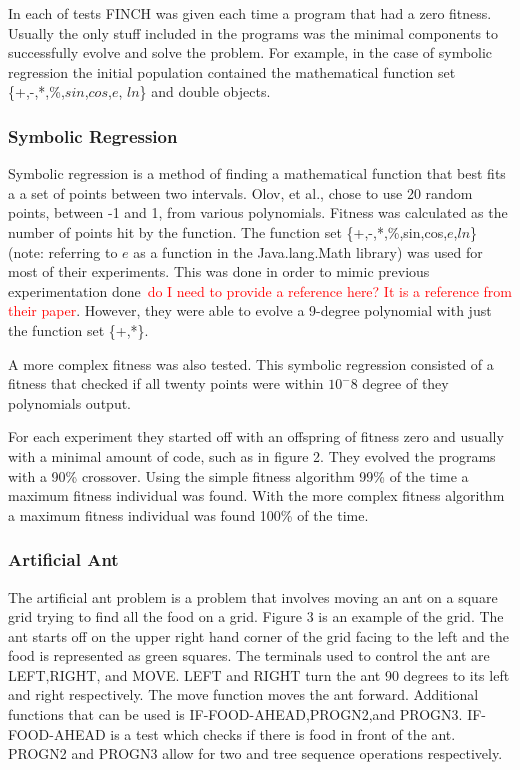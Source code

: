 \documentclass{sig-alternate}
\newcommand{\mycomment}[1]{\textcolor{red}{#1}}
\begin{document}
In each of tests FINCH was given each time a program that had a zero fitness. Usually the only stuff included in the programs was the minimal components to successfully evolve and solve the problem. For example, in the case of symbolic regression the initial population contained the mathematical function set \{+,-,*,\%,$sin$,$cos$,$e$, $ln$\} and double objects. 


\subsubsection{Symbolic Regression}
Symbolic regression is a method of finding a mathematical function that best fits a a set of points between two intervals. Olov, et al., chose to use 20 random points, between -1 and 1, from various polynomials. Fitness was calculated as the number of points hit by the function. The function set \{+,-,*,\%,sin,cos,$e$,$ln$\}(note: referring to $e$ as a function in the Java.lang.Math library) was used for most of their experiments. This was done in order to mimic previous experimentation done~\mycomment{do I need to provide a reference here? It is a reference from their paper}. However, they were able to evolve a 9-degree polynomial with just the function set \{+,*\}.

A more complex fitness was also tested. This symbolic regression consisted of a fitness that checked if all twenty points were within $10^-8$ degree of they polynomials output. 

For each experiment they started off with an offspring of fitness zero and usually with a minimal amount of code, such as in figure 2. They evolved the programs with a 90\% crossover. Using the simple fitness algorithm 99\% of the time a maximum fitness individual was found. With the more complex fitness algorithm a maximum fitness individual was found 100\% of the time.

	
\subsubsection{Artificial Ant}
	The artificial ant problem is a problem that involves moving an ant on a square grid trying to find all the food on a grid. Figure 3 is an example of the grid. The ant starts off on the upper right hand corner of the grid facing to the left and the food is represented as green squares. The terminals used to control the ant are LEFT,RIGHT, and MOVE. LEFT and RIGHT turn the ant 90 degrees to its left and right respectively. The move function moves the ant forward. Additional functions that can be used is IF-FOOD-AHEAD,PROGN2,and PROGN3. IF-FOOD-AHEAD is a test which checks if there is food in front of the ant. PROGN2 and PROGN3 allow for two and tree sequence operations respectively.\par
\end{document}
